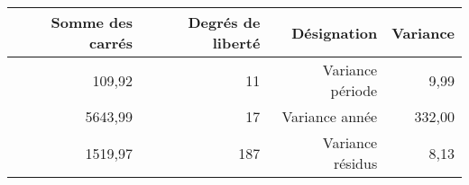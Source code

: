 \begin{tabular}{rrrr}
\toprule
    \textbf{Somme des carrés} & \textbf{Degrés de liberté} & \textbf{Désignation} & \textbf{Variance} \\
\midrule
   109,92 & 11 & Variance période &  9,99 \\ 
   5643,99 & 17  & Variance année & 332,00  \\ 
   1519,97 & 187 & Variance résidus &  8,13 \\ 
\bottomrule 
\end{tabular}
